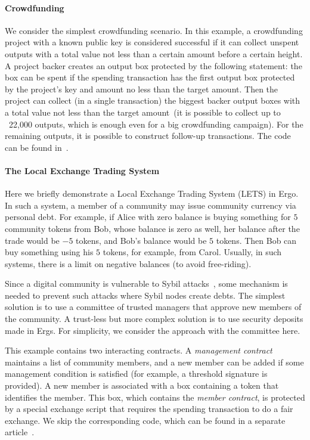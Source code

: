 \paragraph{Crowdfunding}

 We consider the simplest crowdfunding scenario. In this example, a crowdfunding project with a known public key is considered successful if it can collect unspent outputs with a total value not less than a certain amount before a certain height. A project backer creates an output box protected by the following statement: the box can be spent
 if the spending transaction has the first output box protected by the project's key and amount no less than the target amount.
 Then the project can collect (in a single transaction) the biggest backer output boxes with a total value not less than the target amount~(it is possible to collect up to ~22,000 outputs, which is
 enough even for a big crowdfunding campaign). For the remaining outputs, it is possible to construct follow-up transactions. The code can be found in~\cite{ergoTutorial}.

\paragraph{The Local Exchange Trading System}

 Here we briefly demonstrate a Local Exchange Trading System (LETS) in Ergo. In such a system, a member of a community may issue community currency via personal debt. For example, if Alice with zero balance is buying something for $5$
 community tokens from Bob, whose balance is zero as well, her balance after the trade would be $-5$ tokens, and
 Bob's balance would be $5$ tokens. Then Bob can buy something using his $5$ tokens, for example, from Carol.
 Usually, in such systems, there is a limit on negative balances (to avoid free-riding).

 Since a digital community is vulnerable to Sybil attacks~\cite{sybilDef}, some mechanism is needed to prevent such attacks where Sybil nodes create debts.
 The simplest solution is to use a committee of trusted managers that approve new members of the community. A trust-less but more complex solution is to use security deposits made in Ergs. For simplicity, we consider the approach with the committee here.

 This example contains two interacting contracts. A {\em management contract} maintains a list of community members, and a new member can be added if some management condition is satisfied  (for example, a threshold
 signature is provided). A new member is associated with a box containing a token that identifies the member. This box, which contains the {\em member contract}, is protected by a special exchange script that requires the spending transaction to do a fair exchange.
 We skip the corresponding code, which can be found in a separate article~\cite{letsTutorial}.
 
